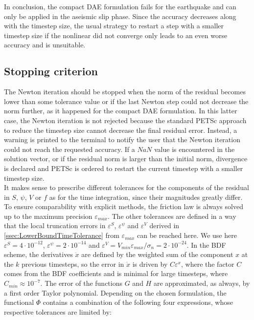 In conclusion, the compact DAE formulation fails for the earthquake and can only be applied in the aseismic slip phase. Since the accuracy decreases along with the timestep size, the usual strategy to restart a step with a smaller timestep size if the nonlinear did not converge only leads to an even worse accuracy and is unsuitable.

\subsection{Stopping criterion}
\label{ssec:StoppingCriterionNewton}
The Newton iteration should be stopped when the norm of the residual becomes lower than some tolerance value or if the last Newton step could not decrease the norm further, as it happened for the compact DAE formulation. In this latter case, the Newton iteration is not rejected because the standard PETSc approach to reduce the timestep size cannot decrease the final residual error. Instead, a warning is printed to the terminal to notify the user that the Newton iteration could not reach the requested accuracy. If a $NaN$ value is encountered in the solution vector, or if the residual norm is larger than the initial norm, divergence is declared and PETSc is ordered to restart the current timestep with a smaller timestep size. \\
It makes sense to prescribe different tolerances for the components of the residual in $S$, $\psi$, $V$ or $f$ as for the time integration, since their magnitudes greatly differ. To ensure comparability with explicit methods, the friction law is always solved up to the maximum precision $\varepsilon_{max}$. The other tolerances are defined in a way that the local truncation errors in $\varepsilon^S$, $\varepsilon^\psi$ and $\varepsilon^V$ derived in \autoref{ssec:LowerBoundTimeTolerance} from $\varepsilon_{max}$ can be reached here. We use here $\varepsilon^S=4\cdot10^{-12}$, $\varepsilon^\psi=2\cdot10^{-14}$ and $\varepsilon^V=V_{min}\varepsilon_{max}/\sigma_n=2\cdot10^{-24}$. In the BDF scheme, the derivatives $\dot{x}$ are defined by the weighted sum of the component $x$ at the $k$ previous timesteps, so the error in $\dot{x}$ is driven by $C\varepsilon^x$, where the factor $C$ comes from the BDF coefficients and is minimal for large timesteps, where $C_{min}\approx10^{-7}$. The error of the functions $G$ and $H$ are approximated, as always, by a first order Taylor polynomial. Depending on the chosen formulation, the functional $\Phi$ contains a combination of the following four expressions, whose respective tolerances are limited by: 
